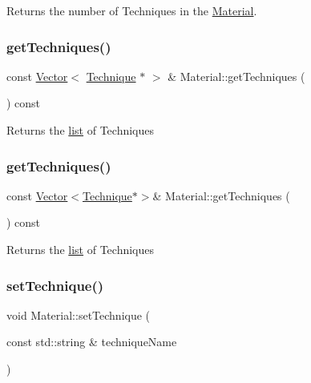 Returns the number of Techniques in the \hyperlink{classMaterial}{Material}. \mbox{\label{classMaterial_aa185c54c143d5a53a793c6653dc8b606}} 
\subsubsection{\texorpdfstring{get\+Techniques()}{getTechniques()}\hspace{0.1cm}{\footnotesize\ttfamily [1/2]}}
{\footnotesize\ttfamily const \hyperlink{classVector}{Vector}$<$ \hyperlink{classTechnique}{Technique} $\ast$ $>$ \& Material\+::get\+Techniques (\begin{DoxyParamCaption}{ }\end{DoxyParamCaption}) const}

Returns the \hyperlink{protocollist-p}{list} of Techniques \mbox{\label{classMaterial_a402a3684251c8ac436b7412ac361c253}} 
\subsubsection{\texorpdfstring{get\+Techniques()}{getTechniques()}\hspace{0.1cm}{\footnotesize\ttfamily [2/2]}}
{\footnotesize\ttfamily const \hyperlink{classVector}{Vector}$<$\hyperlink{classTechnique}{Technique}$\ast$$>$\& Material\+::get\+Techniques (\begin{DoxyParamCaption}{ }\end{DoxyParamCaption}) const}

Returns the \hyperlink{protocollist-p}{list} of Techniques \mbox{\label{classMaterial_a8f575095237a64a95d08a2a3062acc4f}} 
\subsubsection{\texorpdfstring{set\+Technique()}{setTechnique()}\hspace{0.1cm}{\footnotesize\ttfamily [1/2]}}
{\footnotesize\ttfamily void Material\+::set\+Technique (\begin{DoxyParamCaption}\item[{const std\+::string \&}]{technique\+Name }\end{DoxyParamCaption})}

